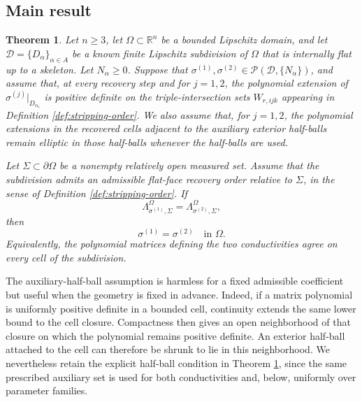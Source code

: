 \documentclass[11pt,oneside]{article}
\newtheorem{theorem}{Theorem}[section]
\newcommand{\R}{\mathbb R}
\newcommand{\DN}{\Lambda}
\begin{document}
\subsection{Main result}

\begin{theorem}
\label{thm:main}
Let \(n\ge3\), let \(\Omega\subset\R^n\) be a bounded Lipschitz domain, and let
\(\mathcal D=\{D_\alpha\}_{\alpha\in A}\) be a known finite Lipschitz
subdivision of \(\Omega\) that is internally flat up to a skeleton.  Let
\(N_\alpha\ge0\).  Suppose that
\(\sigma^{(1)},\sigma^{(2)}\in\mathcal P(\mathcal D,\{N_\alpha\})\), and assume
that, at every recovery step and for \(j=1,2\), the polynomial extension of
\(\sigma^{(j)}|_{D_{\alpha_r}}\) is positive definite on the triple-intersection
sets \(W_{r,ijk}\) appearing in Definition \ref{def:stripping-order}.  We also
  assume that, for \(j=1,2\), the polynomial extensions in the recovered cells
  adjacent to the auxiliary exterior half-balls remain elliptic in those
  half-balls whenever the half-balls are used.

Let \(\Sigma\subset\partial\Omega\) be a nonempty relatively open measured set.
Assume that the subdivision admits an admissible flat-face recovery order
relative to \(\Sigma\), in the sense of Definition \ref{def:stripping-order}.
If
\begin{equation}
  \DN^\Omega_{\sigma^{(1)},\Sigma}
  =\DN^\Omega_{\sigma^{(2)},\Sigma},
  \label{eq:outer-dn-equality}
\end{equation}
then
\begin{equation}
  \sigma^{(1)}=\sigma^{(2)}\quad\text{in }\Omega.
\end{equation}
Equivalently, the polynomial matrices defining the two conductivities agree on
every cell of the subdivision.

\end{theorem}

The auxiliary-half-ball assumption is harmless for a fixed admissible
coefficient but useful when the geometry is fixed in advance.  Indeed, if a
matrix polynomial is uniformly positive definite in a bounded cell, continuity
extends the same lower bound to the cell closure.  Compactness then gives an
open neighborhood of that closure on which the polynomial remains positive
definite.  An exterior half-ball attached to the cell can therefore be shrunk
to lie in this neighborhood.  We nevertheless retain the explicit half-ball
condition in Theorem \ref{thm:main}, since the same prescribed auxiliary set is
used for both conductivities and, below, uniformly over parameter families.
\end{document}
